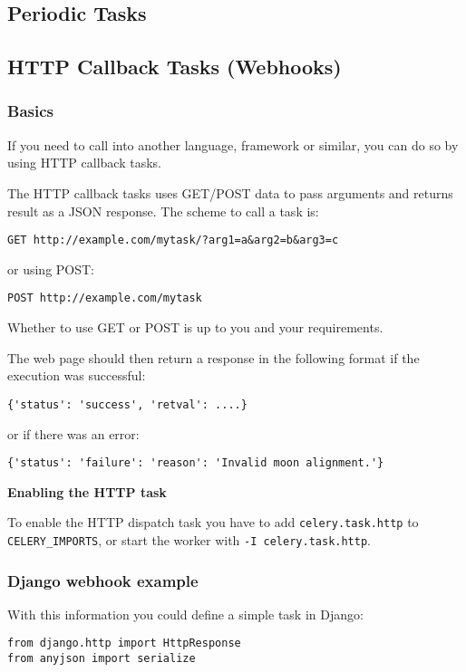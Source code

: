 \documentclass[9pt,a4paper]{article}
\begin{document}
\begin{CJK*}{GBK}{kai}
\subsection{Periodic Tasks}

\subsection{HTTP Callback Tasks (Webhooks)}
\subsubsection{Basics}
If you need to call into another language, framework or similar, you can do so by using HTTP callback tasks.

The HTTP callback tasks uses GET/POST data to pass arguments and returns result as a JSON response. The scheme to call a task is:

\begin{Verbatim}[frame=single]
GET http://example.com/mytask/?arg1=a&arg2=b&arg3=c
\end{Verbatim}

or using POST:

\begin{Verbatim}[frame=single]
POST http://example.com/mytask
\end{Verbatim}

Whether to use GET or POST is up to you and your requirements.

The web page should then return a response in the following format if the execution was successful:
\begin{Verbatim}[frame=single]
{'status': 'success', 'retval': ....}
\end{Verbatim}
or if there was an error:
\begin{Verbatim}[frame=single]
{'status': 'failure': 'reason': 'Invalid moon alignment.'}
\end{Verbatim}

\textbf{Enabling the HTTP task}

To enable the HTTP dispatch task you have to add \verb"celery.task.http" to \verb"CELERY_IMPORTS", or start the worker with \verb"-I celery.task.http".

\subsubsection{Django webhook example}
With this information you could define a simple task in Django:
\begin{Verbatim}[frame=single]
from django.http import HttpResponse
from anyjson import serialize



\end{Verbatim}
\end{CJK*}
\end{document}
